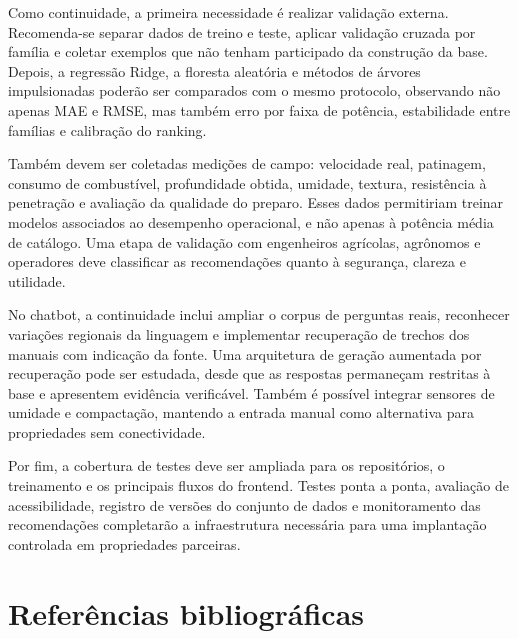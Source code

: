 \documentclass[12pt,a4paper]{article}
\begin{document}
\begin{sloppypar}
Como continuidade, a primeira necessidade é realizar validação externa. Recomenda-se separar dados de treino e teste, aplicar validação cruzada por família e coletar exemplos que não tenham participado da construção da base. Depois, a regressão Ridge, a floresta aleatória e métodos de árvores impulsionadas poderão ser comparados com o mesmo protocolo, observando não apenas MAE e RMSE, mas também erro por faixa de potência, estabilidade entre famílias e calibração do ranking.
\end{sloppypar}

Também devem ser coletadas medições de campo: velocidade real, patinagem, consumo de combustível, profundidade obtida, umidade, textura, resistência à penetração e avaliação da qualidade do preparo. Esses dados permitiriam treinar modelos associados ao desempenho operacional, e não apenas à potência média de catálogo. Uma etapa de validação com engenheiros agrícolas, agrônomos e operadores deve classificar as recomendações quanto à segurança, clareza e utilidade.

No chatbot, a continuidade inclui ampliar o corpus de perguntas reais, reconhecer variações regionais da linguagem e implementar recuperação de trechos dos manuais com indicação da fonte. Uma arquitetura de geração aumentada por recuperação pode ser estudada, desde que as respostas permaneçam restritas à base e apresentem evidência verificável. Também é possível integrar sensores de umidade e compactação, mantendo a entrada manual como alternativa para propriedades sem conectividade.

Por fim, a cobertura de testes deve ser ampliada para os repositórios, o treinamento e os principais fluxos do frontend. Testes ponta a ponta, avaliação de acessibilidade, registro de versões do conjunto de dados e monitoramento das recomendações completarão a infraestrutura necessária para uma implantação controlada em propriedades parceiras.

\section{Referências bibliográficas}
\end{document}
